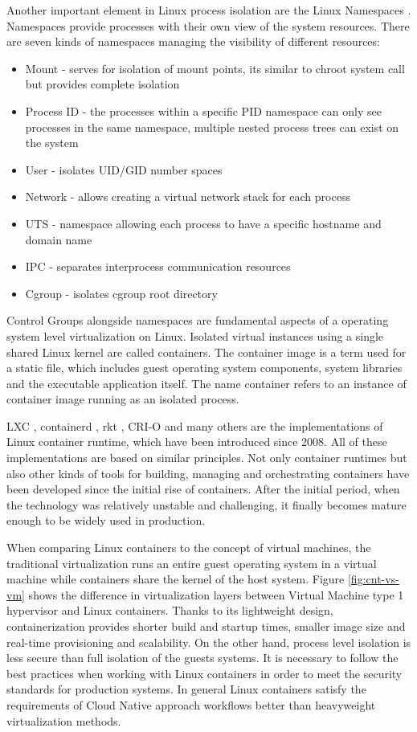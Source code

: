 \documentclass[
  digital, %
  twoside, %
  table,   %
  nolof,   %
  nolot,   %
]{fithesis3}
\begin{document}
Another important element in Linux process isolation are the Linux Namespaces \cite{linux_namespaces}. Namespaces provide processes with their own view of the system resources. There are seven kinds of namespaces managing the visibility of different resources:
\begin{itemize}
  \item Mount - serves for isolation of mount points, its similar to chroot system call but provides complete isolation
  \item Process ID - the processes within a specific PID namespace can only see processes in the same namespace, multiple nested process trees can exist on the system
  \item User - isolates UID/GID number spaces
  \item Network - allows creating a virtual network stack for each process
  \item UTS - namespace allowing each process to have a specific hostname and domain name
  \item IPC - separates interprocess communication resources
  \item Cgroup - isolates cgroup root directory
\end{itemize}


Control Groups alongside namespaces are fundamental aspects of a operating system level virtualization on Linux. Isolated virtual instances using a single shared Linux kernel are called containers. The container image is a term used for a static file, which includes guest operating system components, system libraries and the executable application itself. The name container refers to an instance of container image running as an isolated process.

LXC \cite{lxc}, containerd \cite{containerd}, rkt \cite{rkt}, CRI-O \cite{cri-o} and many others are the implementations of Linux container runtime, which have been introduced since 2008. All of these implementations are based on similar principles. Not only container runtimes but also other kinds of tools for building, managing and orchestrating containers have been developed since the initial rise of containers. After the initial period, when the technology was relatively unstable and challenging, it finally becomes mature enough to be widely used in production.

When comparing Linux containers to the concept of virtual machines, the traditional virtualization runs an entire guest operating system in a virtual machine while containers share the kernel of the host system. Figure \ref{fig:cnt-vs-vm} shows the difference in virtualization layers between Virtual Machine type 1 hypervisor \cite{hypervisors} and Linux containers. Thanks to its lightweight design, containerization provides shorter build and startup times, smaller image size and real-time provisioning and scalability. On the other hand, process level isolation is less secure than full isolation of the guests systems. It is necessary to follow the best practices when working with Linux containers in order to meet the security standards for production systems. In general Linux containers satisfy the requirements of Cloud Native approach workflows better than heavyweight virtualization methods.
\end{document}
